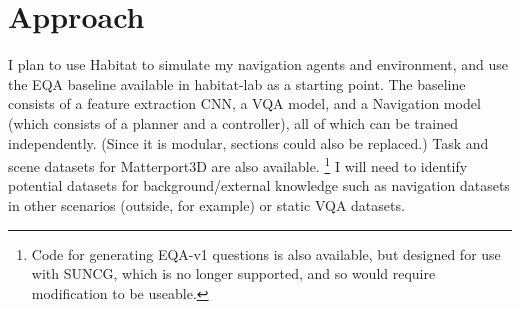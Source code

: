 \documentclass{article}
\begin{document}



\section{Approach}
I plan to use Habitat to simulate my navigation agents and environment, and use the EQA baseline available in habitat-lab as a starting point. The baseline consists of a feature extraction CNN, a VQA model, and a Navigation model (which consists of a planner and a controller), all of which can be trained independently. (Since it is modular, sections could also be replaced.) Task and scene datasets for Matterport3D are also available. \footnote{Code for generating EQA-v1 questions is also available, but designed for use with SUNCG, which is no longer supported, and so would require modification to be useable\cite{embodiedqa}.} I will need to identify potential datasets for background/external knowledge such as navigation datasets in other scenarios (outside, for example) or static VQA datasets. 
\end{document}
